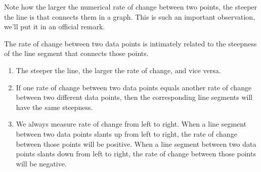 \documentclass{ximera}
\begin{document}

Note how the larger the numerical rate of change between two points, the steeper the line is that connects them in a graph. This is such an important observation, we'll put it in an official remark.

\begin{tcolorbox}[colback=blue!5]
\begin{remark}
The rate of change between two data points is intimately related to the steepness of the line segment that connects those points.
\begin{enumerate}
\item The steeper the line, the larger the rate of change, and vice versa.
\item If one rate of change between two data points equals another rate of change between two different data points, then the corresponding line segments will have the same steepness.
\item We always measure rate of change from left to right. When a line segment between two data points slants up from left to right, the rate of change between those points will be positive. When a line segment between two data points slants down from left to right, the rate of change between those points will be negative.
\end{enumerate}
\end{remark}
\end{tcolorbox}
\end{document}
